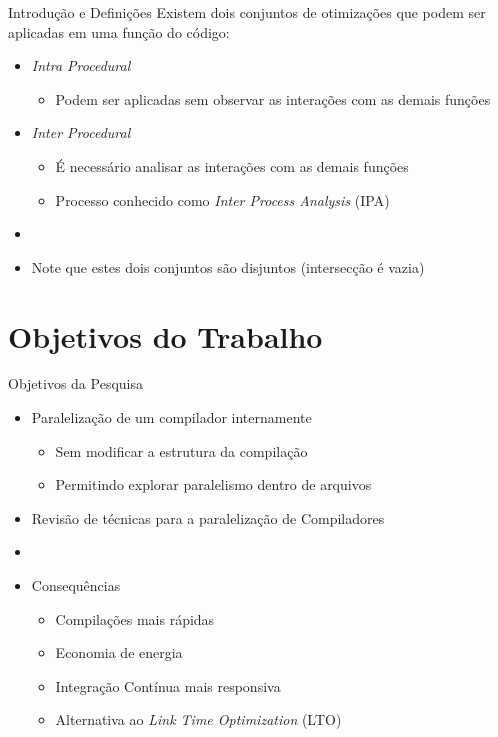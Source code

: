 \begin{frame}{Introdução e Definições}
    Existem dois conjuntos de otimizações que podem ser aplicadas em uma função do código:
  \begin{itemize}
    \item \textit{Intra Procedural}
        \begin{itemize}
            \item Podem ser aplicadas sem observar as interações com as demais funções
        \end{itemize}
    \item \textit{Inter Procedural}
        \begin{itemize}
            \item É necessário analisar as interações com as demais funções
            \item Processo conhecido como \textit{Inter Process Analysis} (IPA)
        \end{itemize}
    \item[]
    \item Note que estes dois conjuntos são disjuntos (intersecção é vazia)
  \end{itemize}
\end{frame}

\section{Objetivos do Trabalho}

\begin{frame}{Objetivos da Pesquisa}
    \begin{itemize}
        \item Paralelização de um compilador internamente
        \begin{itemize}
            \item Sem modificar a estrutura da compilação
            \item Permitindo explorar paralelismo dentro de arquivos
        \end{itemize}
        \item Revisão de técnicas para a paralelização de Compiladores
        \item[]
        \item Consequências
        \begin{itemize}
            \item Compilações mais rápidas
            \item Economia de energia
            \item Integração Contínua mais responsiva
            \item Alternativa ao \textit{Link Time Optimization} (LTO)
        \end{itemize}
    \end{itemize}
\end{frame}

